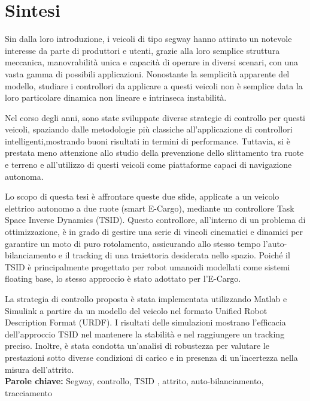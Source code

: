 \chapter*{Sintesi} 
\label{ch:Sintesi}

 Sin dalla loro introduzione, i veicoli di tipo segway hanno attirato un notevole interesse da parte di produttori e utenti, grazie alla loro semplice struttura meccanica, manovrabilità unica e capacità di operare in diversi scenari, con una vasta gamma di possibili applicazioni. Nonostante la semplicità apparente del modello, studiare i controllori da applicare a questi veicoli non è semplice data la loro particolare dinamica non lineare e intrinseca instabilità.

Nel corso degli anni, sono state sviluppate diverse strategie di controllo per questi veicoli, spaziando dalle metodologie più classiche all'applicazione di controllori intelligenti,mostrando buoni risultati in termini di performance. Tuttavia, si è prestata meno attenzione allo studio della prevenzione dello slittamento tra ruote e terreno e all'utilizzo di questi veicoli come piattaforme capaci di navigazione autonoma.

Lo scopo di questa tesi è affrontare queste due sfide, applicate a un veicolo elettrico autonomo a due ruote (smart E-Cargo), mediante un controllore Task Space Inverse Dynamics (TSID). Questo controllore, all'interno di un problema di ottimizzazione, è in grado di gestire una serie di vincoli cinematici e dinamici per garantire un moto di puro rotolamento, assicurando allo stesso tempo l'auto-bilanciamento e il tracking di una traiettoria desiderata nello spazio. Poiché il TSID è principalmente progettato per robot umanoidi modellati come sistemi floating base, lo stesso approccio è stato adottato per l'E-Cargo.

La strategia di controllo proposta è stata implementata utilizzando Matlab e Simulink a partire da un modello del veicolo nel formato Unified Robot Description Format (URDF). I risultati delle simulazioni mostrano l'efficacia dell'approccio TSID nel mantenere la stabilità e nel raggiungere un tracking preciso. Inoltre, è stata condotta un'analisi di robustezza per valutare le prestazioni sotto diverse condizioni di carico e in presenza di un'incertezza nella misura dell'attrito.
\\
\textbf{Parole chiave:} Segway, controllo, TSID , attrito, auto-bilanciamento, tracciamento %